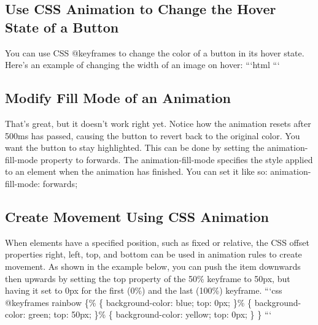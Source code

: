 \documentclass{article}%
\begin{document}
%
\subsection{Use CSS Animation to Change the Hover State of a Button}%
\label{subsec:UseCSSAnimationtoChangetheHoverStateofaButton}%
You can use CSS @keyframes to change the color of a button in its hover state.\newline%
Here's an example of changing the width of an image on hover:\newline%
```html\newline%
```\newline%

%
\subsection{Modify Fill Mode of an Animation}%
\label{subsec:ModifyFillModeofanAnimation}%
That's great, but it doesn't work right yet. Notice how the animation resets after 500ms has passed, causing the button to revert back to the original color. You want the button to stay highlighted.\newline%
This can be done by setting the animation{-}fill{-}mode property to forwards. The animation{-}fill{-}mode specifies the style applied to an element when the animation has finished. You can set it like so:\newline%
animation{-}fill{-}mode: forwards;\newline%

%
\subsection{Create Movement Using CSS Animation}%
\label{subsec:CreateMovementUsingCSSAnimation}%
When elements have a specified position, such as fixed or relative, the CSS offset properties right, left, top, and bottom can be used in animation rules to create movement.\newline%
As shown in the example below, you can push the item downwards then upwards by setting the top property of the 50\% keyframe to 50px, but having it set to 0px for the first (0\%) and the last (100\%) keyframe.\newline%
```css\newline%
@keyframes rainbow \{\% \{\newline%
    background{-}color: blue;\newline%
    top: 0px;\newline%
  \}\% \{\newline%
    background{-}color: green;\newline%
    top: 50px;\newline%
  \}\% \{\newline%
    background{-}color: yellow;\newline%
    top: 0px;\newline%
  \}\newline%
\}\newline%
```\newline%
\end{document}

